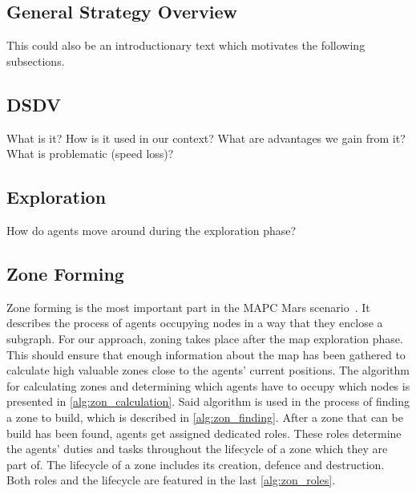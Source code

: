 \subsection{General Strategy Overview}
This could also be an introductionary text which motivates the following subsections.


\subsection{DSDV}
What is it? How is it used in our context? What are advantages we gain from it? What is problematic (speed loss)?

\subsection{Exploration}\label{alg:exploration}
How do agents move around during the exploration phase?

\subsection{Zone Forming}
Zone forming is the most important part in the MAPC Mars scenario~\cite{ahlbrecht_mapc_2014}.%
It describes the process of agents occupying nodes in a way that they enclose a subgraph. For our approach, zoning takes place after the map exploration phase. This should ensure that enough information about the map has been gathered to calculate high valuable zones close to the agents' current positions. The algorithm for calculating zones and determining which agents have to occupy which nodes is presented in \autoref{alg:zon_calculation}.
Said algorithm is used in the process of finding a zone to build, which is described in \autoref{alg:zon_finding}. After a zone that can be build has been found, agents get assigned dedicated roles. These roles determine the agents' duties and tasks throughout the lifecycle of a zone which they are part of. The lifecycle of a zone includes its creation, defence and destruction. Both roles and the lifecycle are featured in the last \autoref{alg:zon_roles}.




